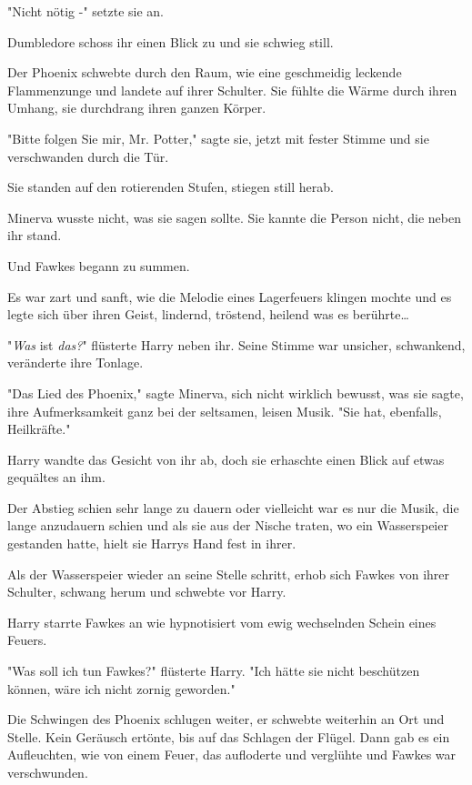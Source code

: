{"Nicht nötig -" setzte sie an.

Dumbledore schoss ihr einen Blick zu und sie schwieg still.

Der Phoenix schwebte durch den Raum, wie eine geschmeidig leckende Flammenzunge und landete auf ihrer Schulter. Sie fühlte die Wärme durch ihren Umhang, sie durchdrang ihren ganzen Körper.

"Bitte folgen Sie mir, Mr. Potter," sagte sie, jetzt mit fester Stimme und sie verschwanden durch die Tür.

\later

Sie standen auf den rotierenden Stufen, stiegen still herab.

Minerva wusste nicht, was sie sagen sollte. Sie kannte die Person nicht, die neben ihr stand.

Und Fawkes begann zu summen.

Es war zart und sanft, wie die Melodie eines Lagerfeuers klingen mochte und es legte sich über ihren Geist, lindernd, tröstend, heilend was es berührte…

"\emph{Was} ist \emph{das?}" flüsterte Harry neben ihr. Seine Stimme war unsicher, schwankend, veränderte ihre Tonlage.

"Das Lied des Phoenix," sagte Minerva, sich nicht wirklich bewusst, was sie sagte, ihre Aufmerksamkeit ganz bei der seltsamen, leisen Musik. "Sie hat, ebenfalls, Heilkräfte."

Harry wandte das Gesicht von ihr ab, doch sie erhaschte einen Blick auf etwas gequältes an ihm.

Der Abstieg schien sehr lange zu dauern oder vielleicht war es nur die Musik, die lange anzudauern schien und als sie aus der Nische traten, wo ein Wasserspeier gestanden hatte, hielt sie Harrys Hand fest in ihrer.

Als der Wasserspeier wieder an seine Stelle schritt, erhob sich Fawkes von ihrer Schulter, schwang herum und schwebte vor Harry.

Harry starrte Fawkes an wie hypnotisiert vom ewig wechselnden Schein eines Feuers.

"Was soll ich tun Fawkes?" flüsterte Harry. "Ich hätte sie nicht beschützen können, wäre ich nicht zornig geworden."

Die Schwingen des Phoenix schlugen weiter, er schwebte weiterhin an Ort und Stelle. Kein Geräusch ertönte, bis auf das Schlagen der Flügel. Dann gab es ein Aufleuchten, wie von einem Feuer, das aufloderte und verglühte und Fawkes war verschwunden.

}
